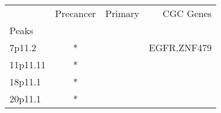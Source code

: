 \begin{tabular}{lccr}
\toprule
{} & Precancer & Primary &    CGC Genes \\
Peaks    &           &         &              \\
\midrule
7p11.2   &         * &         &  EGFR,ZNF479 \\
11p11.11 &         * &         &              \\
18p11.1  &         * &         &              \\
20p11.1  &         * &         &              \\
\bottomrule
\end{tabular}
